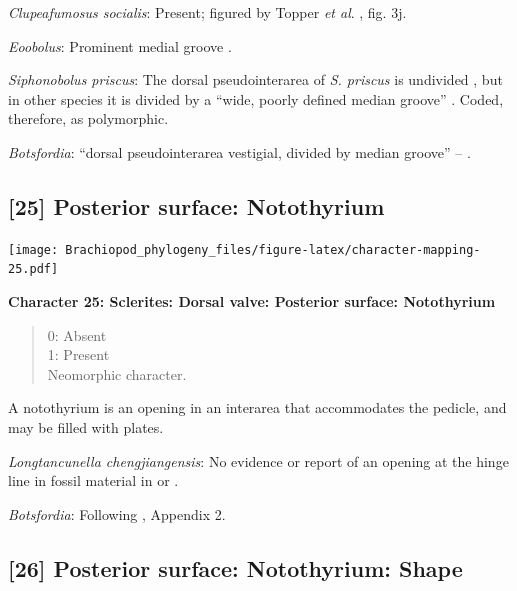 \documentclass[]{book}
\theoremstyle{definition}
\theoremstyle{definition}
\theoremstyle{definition}
\theoremstyle{remark}
\begin{document}
\emph{Clupeafumosus socialis}: Present; figured by Topper \emph{et al}.
\citeyearpar{Topper2013Reappraisalof}, fig. 3j.

\emph{Eoobolus}: Prominent medial groove
\citep{Balthasar2009Thebrachiopod}.

\emph{Siphonobolus priscus}: The dorsal pseudointerarea of \emph{S.
priscus} is undivided \citep{Popov2009Earlyontogeny}, but in other
species it is divided by a ``wide, poorly defined median groove''
\citep{Williams2000BrachiopodaLinguliformea}. Coded, therefore, as
polymorphic.

\emph{Botsfordia}: ``dorsal pseudointerarea vestigial, divided by median
groove'' -- \citet{Williams2000BrachiopodaLinguliformea}.

\hypertarget{posterior-surface-notothyrium}{%
\subsection*{{[}25{]} Posterior surface:
Notothyrium}\label{posterior-surface-notothyrium}}

\texttt{[image: Brachiopod\_phylogeny\_files/figure-latex/character-mapping-25.pdf]}

\textbf{Character 25: Sclerites: Dorsal valve: Posterior surface:
Notothyrium}

\begin{quote}
0: Absent\\
1: Present\\
Neomorphic character.
\end{quote}

A notothyrium is an opening in an interarea that accommodates the
pedicle, and may be filled with plates.

\emph{Longtancunella chengjiangensis}: No evidence or report of an
opening at the hinge line in fossil material in
\citet{Zhang2007Agregarious} or \citet{Zhang2011Theexceptionally}.

\emph{Botsfordia}: Following \citet{Williams1998Thediversity}, Appendix
2.

\hypertarget{posterior-surface-notothyrium-shape}{%
\subsection*{{[}26{]} Posterior surface: Notothyrium:
Shape}\label{posterior-surface-notothyrium-shape}}
\end{document}
